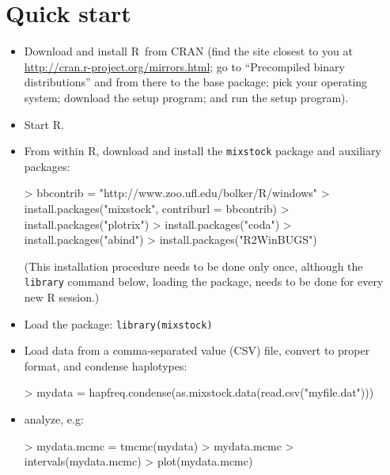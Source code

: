 \documentclass[11pt]{article}
\newcommand{\R}{{\sf R}}
\begin{document}
\section{Quick start}
\label{sec:quickstart}
\begin{itemize}
\item{Download and install \R\ from
CRAN (find the site closest to you
at \url{http://cran.r-project.org/mirrors.html};
go to ``Precompiled binary distributions'' and
from there to the base package; pick
your operating system; download the setup 
program; and run the setup program).
}
\item{Start \R.}
\item{From within \R,
download and install the {\tt mixstock}
package and auxiliary packages:
\begin{Schunk}
\begin{Sinput}
> bbcontrib = "http://www.zoo.ufl.edu/bolker/R/windows"
> install.packages("mixstock", contriburl = bbcontrib)
> install.packages("plotrix")
> install.packages("coda")
> install.packages("abind")
> install.packages("R2WinBUGS")
\end{Sinput}
\end{Schunk}
(This installation procedure needs to be done
only once, although the {\tt library} command
below, loading the package, needs to be done for every new R session.)
}
\item{Load the package: {\tt library(mixstock)}}
\item{Load data from a comma-separated value (CSV) file,
convert to proper format, and condense haplotypes:
\begin{Schunk}
\begin{Sinput}
> mydata = hapfreq.condense(as.mixstock.data(read.csv("myfile.dat")))
\end{Sinput}
\end{Schunk}
} 
\item{analyze, e.g:
\begin{Schunk}
\begin{Sinput}
> mydata.mcmc = tmcmc(mydata)
> mydata.mcmc
> intervals(mydata.mcmc)
> plot(mydata.mcmc)
\end{Sinput}
\end{Schunk}
}
\end{itemize}
\end{document}
